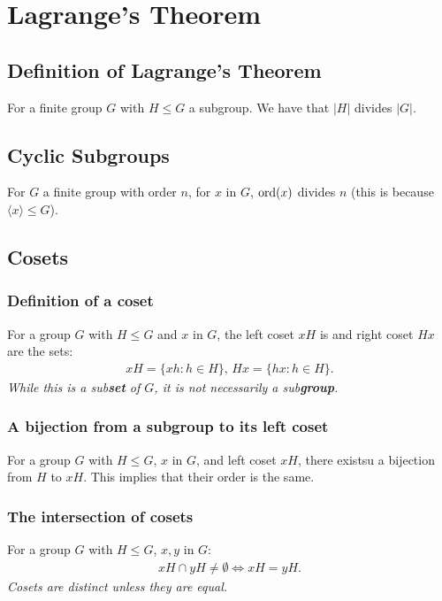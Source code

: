 \documentclass[a4paper, 12pt, twoside]{article}
\begin{document}
\section{Lagrange's Theorem}

\subsection{Definition of Lagrange's Theorem}

For a finite group $G$ with $H \leq G$ a subgroup. We have that
$|H|$ divides $|G|$.

\subsection{Cyclic Subgroups}

For $G$ a finite group with order $n$, for $x$ in $G$, $\operatorname{ord}(x)$ divides
$n$ (this is because $\langle x \rangle \leq G$).

\subsection{Cosets}

\subsubsection{Definition of a coset}

For a group $G$ with $H \leq G$ and $x$ in $G$, the left coset $xH$ is
and right coset $Hx$ are the sets:
\begin{align*}
      xH = \{xh : h \in H\}, \, Hx = \{hx : h \in H\}.
\end{align*}
\textit{While this is a sub\textbf{set} of $G$, it is not necessarily
      a sub\textbf{group}.}

\subsubsection{A bijection from a subgroup to its left coset}

For a group $G$ with $H \leq G$, $x$ in $G$, and left coset $xH$,
there existsu a bijection from $H$ to $xH$. This implies that their
order is the same.

\subsubsection{The intersection of cosets}

For a group $G$ with $H \leq G$, $x, y$ in $G$:
\begin{align*}
      xH \cap yH \neq \emptyset \Leftrightarrow xH = yH.
\end{align*}
\textit{Cosets are distinct unless they are equal.}
\end{document}

